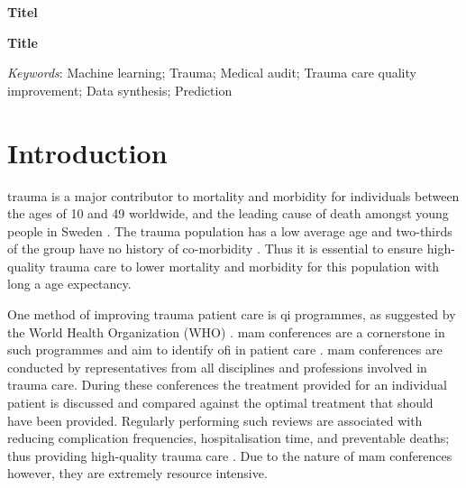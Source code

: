\documentclass[12pt, letterpaper]{article}
\begin{document}
\begin{titlepage}
    
\end{titlepage}


\textbf{Titel}

\lipsum[1]

\vfill

\textbf{Title}

\lipsum[1]

\vfill

\textit{Keywords}: Machine learning; Trauma; Medical audit; Trauma care quality improvement; Data synthesis; Prediction

\newpage

\glsaddall
\printnoidxglossary[type=acronym,style=csuper]
\printnoidxglossary[style=gsuper]

\newpage
{}


\section{Introduction}
\Gls{trauma} is a major contributor to mortality and morbidity for individuals between the ages of 10 and 49 worldwide, and the leading cause of death amongst young people in Sweden \cite{roth_global_2018, vos_global_2020, sos_death_2021}. The \gls{trauma} population has a low average age and two-thirds of the group have no history of co-morbidity \cite{brattstrom_socio-economic_2015}. Thus it is essential to ensure high-quality \gls{trauma} care to lower mortality and morbidity for this population with long a age expectancy.

One method of improving trauma patient care is \acrfull{qi} programmes, as suggested by the World Health Organization (WHO) \cite{world_health_organization_guidelines_2009}. \Acrfull{mam} conferences are a cornerstone in such programmes and aim to identify \acrfull{ofi} in patient care \cite{santana_development_2014}. \acrshort{mam} conferences are conducted by representatives from all disciplines and professions involved in trauma care. During these conferences the treatment provided for an individual patient is discussed and compared against the optimal treatment that should have been provided. Regularly performing such reviews are associated with reducing complication frequencies, hospitalisation time, and preventable deaths; thus providing high-quality trauma care \cite{stelfox_evidence_2011, mcdermott_trauma_1994}. Due to the nature of \acrshort{mam} conferences however, they are extremely resource intensive.
\end{document}
